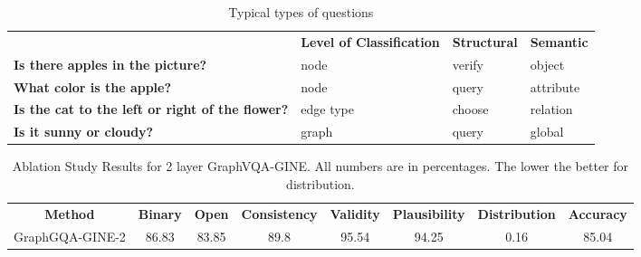 \documentclass[11pt]{article}
\begin{document}
\begin{table*}[htb]
    \centering
    \begin{adjustbox}{max width=0.8\textwidth}
    \begin{tabular}[t]{llll}
        \cmidrule[\heavyrulewidth]{1-4}

        
        \textbf{  } & \textbf{Level of Classification}  & \textbf{Structural} & \textbf{Semantic}\\
        \cmidrule{1-4}
        \textbf{Is there apples in the picture?}              &  node & verify& object   \\
        \textbf{What color is the apple?}                 &   node & query & attribute   \\
        \textbf{Is the cat to the left or right of the flower?}             &      edge type & choose & relation   \\


        \textbf{Is it sunny or cloudy?}   &  graph & query& global   \\

        \cmidrule[\heavyrulewidth]{1-4}
    \end{tabular}
    \end{adjustbox}
    \caption{Typical types of questions
    }
    \label{tab:data}
\end{table*}
\begin{table*}[htb]
\begin{center}
\tabcolsep=0.06cm
\begin{adjustbox}{max width=0.8\textwidth}
\begin{tabular}{cccccccc}
\cmidrule[\heavyrulewidth]{1-8}
\textbf{Method} &  \textbf{Binary} & \textbf{Open}  & \textbf{Consistency} & \textbf{Validity} & \textbf{Plausibility} & \textbf{Distribution} & \textbf{Accuracy} \\ 
\cmidrule{1-8}
GraphGQA-GINE-2       & 86.83          &        83.85        &          89.8            &      95.54             &            94.25           &            0.16           &         85.04          \\

\cmidrule[\heavyrulewidth]{1-8}
\end{tabular}
\end{adjustbox}
\caption{
Ablation Study Results for 2 layer GraphVQA-GINE. All numbers are in percentages. 
The lower the better for distribution. 
}
\label{tab:ablationstudy}
\end{center}
\vspace{-5mm}
\end{table*}
\end{document}
